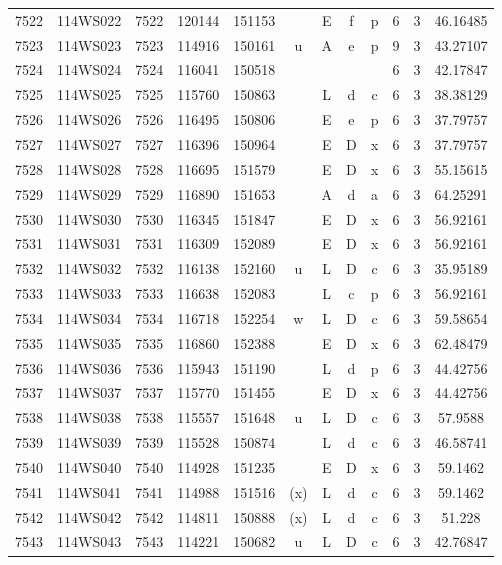 \begin{tabular}{|*{12}{c|}}
7522 & 114WS022 & 7522 & 120144 & 151153 &  & E & f & p & 6 & 3 & 46.16485 \\ 
7523 & 114WS023 & 7523 & 114916 & 150161 & u & A & e & p & 9 & 3 & 43.27107 \\ 
7524 & 114WS024 & 7524 & 116041 & 150518 &  &  &  &  & 6 & 3 & 42.17847 \\ 
7525 & 114WS025 & 7525 & 115760 & 150863 &  & L & d & c & 6 & 3 & 38.38129 \\ 
7526 & 114WS026 & 7526 & 116495 & 150806 &  & E & e & p & 6 & 3 & 37.79757 \\ 
7527 & 114WS027 & 7527 & 116396 & 150964 &  & E & D & x & 6 & 3 & 37.79757 \\ 
7528 & 114WS028 & 7528 & 116695 & 151579 &  & E & D & x & 6 & 3 & 55.15615 \\ 
7529 & 114WS029 & 7529 & 116890 & 151653 &  & A & d & a & 6 & 3 & 64.25291 \\ 
7530 & 114WS030 & 7530 & 116345 & 151847 &  & E & D & x & 6 & 3 & 56.92161 \\ 
7531 & 114WS031 & 7531 & 116309 & 152089 &  & E & D & x & 6 & 3 & 56.92161 \\ 
7532 & 114WS032 & 7532 & 116138 & 152160 & u & L & D & c & 6 & 3 & 35.95189 \\ 
7533 & 114WS033 & 7533 & 116638 & 152083 &  & L & c & p & 6 & 3 & 56.92161 \\ 
7534 & 114WS034 & 7534 & 116718 & 152254 & w & L & D & c & 6 & 3 & 59.58654 \\ 
7535 & 114WS035 & 7535 & 116860 & 152388 &  & E & D & x & 6 & 3 & 62.48479 \\ 
7536 & 114WS036 & 7536 & 115943 & 151190 &  & L & d & p & 6 & 3 & 44.42756 \\ 
7537 & 114WS037 & 7537 & 115770 & 151455 &  & E & D & x & 6 & 3 & 44.42756 \\ 
7538 & 114WS038 & 7538 & 115557 & 151648 & u & L & D & c & 6 & 3 & 57.9588 \\ 
7539 & 114WS039 & 7539 & 115528 & 150874 &  & L & d & c & 6 & 3 & 46.58741 \\ 
7540 & 114WS040 & 7540 & 114928 & 151235 &  & E & D & x & 6 & 3 & 59.1462 \\ 
7541 & 114WS041 & 7541 & 114988 & 151516 & (x) & L & d & c & 6 & 3 & 59.1462 \\ 
7542 & 114WS042 & 7542 & 114811 & 150888 & (x) & L & d & c & 6 & 3 & 51.228 \\ 
7543 & 114WS043 & 7543 & 114221 & 150682 & u & L & D & c & 6 & 3 & 42.76847 \\ 

\end{tabular}
